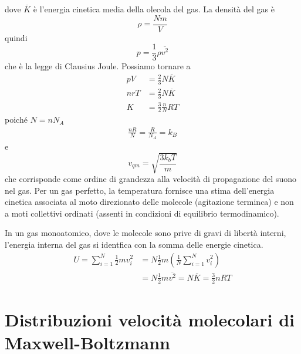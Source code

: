 \documentclass[a4paper]{article}
\begin{document}
dove \(\overline{K}\) è l'energia cinetica media della olecola del gas.
La densità del gas è
\[
    \rho = \frac{Nm}{V}
\]
quindi
\[
    p = \frac{1}{3}\rho \overline{v^2}
\]
che è la legge di Clausius Joule.
Possiamo tornare a
\begin{align*}
    pV &= \frac{2}{3} N \overline{K} \\
    nrT &= \frac{2}{3} N \overline{K} \\
    K &= \frac{3}{2} \frac{n}{N} RT
\end{align*}
poiché \(N = nN_A\)
\begin{align*}
    \frac{nR}{N} = \frac{R}{N_A} = k_B
\end{align*}
e
\[
    v_{qm} = \sqrt{\frac{3k_b T}{m}}
\]
che corrisponde come ordine di grandezza alla velocità di propagazione del suono nel gas.
Per un gas perfetto, la temperatura fornisce una stima dell'energia cinetica associata al moto
direzionato delle molecole (agitazione terminca) e non a moti collettivi ordinati (assenti in condizioni di equilibrio termodinamico).

In un gas monoatomico, dove le molecole sono prive di gravi di libertà interni, l'energia interna del gas
si identfica con la somma delle energie cinetica.
\begin{align*}
    U = \sum_{i=1}^N \frac{1}{2} mv_i^2 &= N\frac{1}{2}m\left(\frac{1}{N} \sum_{i=1}^N v_i^2\right) \\
    &= N \frac{1}{2}m\overline{v^2} = N\overline{K} = \frac{3}{2}nRT
\end{align*}


\section{Distribuzioni velocità molecolari di Maxwell-Boltzmann}
\end{document}
